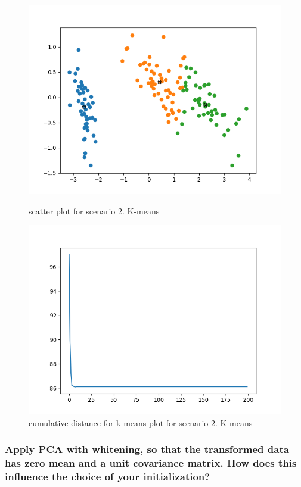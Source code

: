 \documentclass[a4paper]{article}
\begin{document}
\begin{figure}[h!]
\begin{minipage}[t]{6.5cm}
              \includegraphics[width=1.0\textwidth]{pca_k_2_1.png}
              \caption{scatter plot for scenario 2. K-means}
            \end{minipage}
            \hspace{2cm}
            \begin{minipage}[t]{6.5cm}
              \includegraphics[width=1.0\textwidth]{pca_k_2_2.png}
              \caption{cumulative distance for k-means plot for scenario 2. K-means}
            \end{minipage}
        \end{figure}
        \clearpage
	\subsubsection{Apply PCA with whitening, so that the transformed data has zero mean and a unit covariance matrix. How does this influence the choice of your initialization?}
\end{document}

